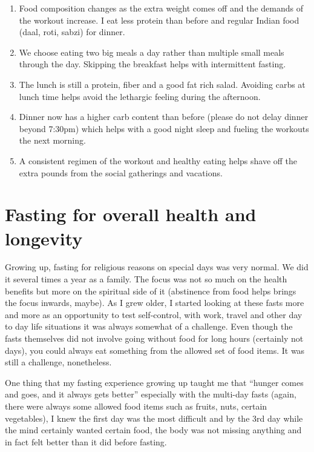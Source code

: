 \documentclass[
  oneside]{book}
\begin{document}
\begin{enumerate}
\def\labelenumi{\arabic{enumi}.}
\item
  Food composition changes as the extra weight comes off and the demands of the workout increase. I eat less protein than before and regular Indian food (daal, roti, sabzi) for dinner.
\item
  We choose eating two big meals a day rather than multiple small meals through the day. Skipping the breakfast helps with intermittent fasting.
\item
  The lunch is still a protein, fiber and a good fat rich salad. Avoiding carbs at lunch time helps avoid the lethargic feeling during the afternoon.
\item
  Dinner now has a higher carb content than before (please do not delay dinner beyond 7:30pm) which helps with a good night sleep and fueling the workouts the next morning.
\item
  A consistent regimen of the workout and healthy eating helps shave off the extra pounds from the social gatherings and vacations.
\end{enumerate}

\hypertarget{fasting-for-overall-health-and-longevity}{%
\chapter{Fasting for overall health and longevity}\label{fasting-for-overall-health-and-longevity}}

Growing up, fasting for religious reasons on special days was very normal. We did it several times a year as a family. The focus was not so much on the health benefits but more on the spiritual side of it (abstinence from food helps brings the focus inwards, maybe). As I grew older, I started looking at these fasts more and more as an opportunity to test self-control, with work, travel and other day to day life situations it was always somewhat of a challenge. Even though the fasts themselves did not involve going without food for long hours (certainly not days), you could always eat something from the allowed set of food items. It was still a challenge, nonetheless.

One thing that my fasting experience growing up taught me that ``hunger comes and goes, and it always gets better'' especially with the multi-day fasts (again, there were always some allowed food items such as fruits, nuts, certain vegetables), I knew the first day was the most difficult and by the 3rd day while the mind certainly wanted certain food, the body was not missing anything and in fact felt better than it did before fasting.
\end{document}
